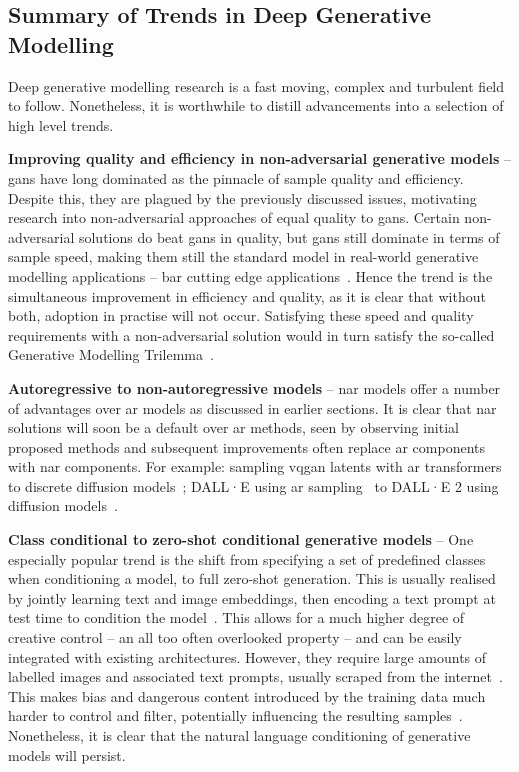 \subsection{Summary of Trends in Deep Generative Modelling}
\label{subsec:trends}

Deep generative modelling research is a fast moving, complex and turbulent field
to follow. Nonetheless, it is worthwhile to distill advancements into a
selection of high level trends.

\textbf{Improving quality and efficiency in non-adversarial generative models} -- 
\glspl{gan} have long dominated as the pinnacle of sample quality and
efficiency. Despite this, they are plagued by the previously discussed issues,
motivating research into non-adversarial approaches of equal quality to
\glspl{gan}. Certain non-adversarial solutions do beat \glspl{gan} in quality,
but \glspl{gan} still dominate in terms of sample speed, making them still the
standard model in real-world generative modelling applications -- bar cutting
edge applications~\cite{ramesh2021dalle,ramesh2022dalle2}. Hence the trend is
the simultaneous improvement in efficiency and quality, as it is clear that
without both, adoption in practise will not occur. Satisfying these speed and
quality requirements with a non-adversarial solution would in turn satisfy the
so-called Generative Modelling Trilemma~\cite{xiao2021trilemma}.

\textbf{Autoregressive to non-autoregressive models} -- 
\Gls{nar} models offer a number of advantages over \gls{ar} models as discussed
in earlier sections. It is clear that \gls{nar} solutions will soon be a default
over \gls{ar} methods, seen by observing initial proposed methods and
subsequent improvements often replace \gls{ar} components with \gls{nar}
components. For example: sampling \gls{vqgan} latents with \gls{ar}
transformers~\cite{esser2021taming} to discrete diffusion
models~\cite{bondtaylor2021unleashing}; DALL·E using \gls{ar}
sampling~\cite{ramesh2021dalle} to DALL·E 2 using diffusion
models~\cite{ramesh2022dalle2}.

\textbf{Class conditional to zero-shot conditional generative models} -- 
One especially popular trend is the shift from specifying a set of predefined
classes when conditioning a model, to full zero-shot generation. This is usually
realised by jointly learning text and image embeddings, then encoding a text
prompt at test time to condition the
model~\cite{ramesh2021dalle,ramesh2022dalle2,rombach2021highresolution,lee2022rqvae}.
This allows for a much higher degree of creative control -- an all too often
overlooked property -- and can be easily integrated with existing architectures.
However, they require large amounts of labelled images and associated text
prompts, usually scraped from the
internet~\cite{rombach2021highresolution,ramesh2021dalle,ramesh2022dalle2}. This
makes bias and dangerous content introduced by the training data much harder to
control and filter, potentially influencing the resulting
samples~\cite{mishkin2022risks}. Nonetheless, it is clear that the natural
language conditioning of generative models will persist.

